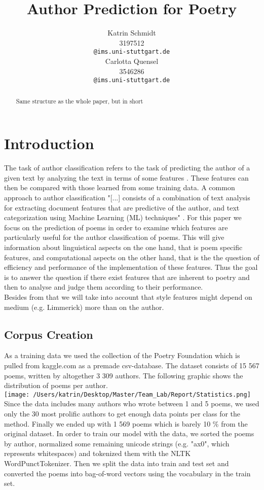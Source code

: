 \documentclass[11pt]{article}
\title{Author Prediction for Poetry}
\author{Katrin Schmidt \\
   3197512\\
  \texttt{@ims.uni-stuttgart.de} \\\And
  Carlotta Quensel \\
  3546286 \\
  \texttt{@ims.uni-stuttgart.de} \\}
\begin{document}
\maketitle
\begin{abstract}
Same structure as the whole paper, but in short
\end{abstract}

\section{Introduction}
The task of author classification refers to the task of predicting the author of a given text by analyzing the text in terms of some features \citet{Argamon:2009}. These features can then be compared with those learned from some training data. A common approach to author classification "[...] consists of a combination of text analysis for extracting document features that are predictive of the author, and text categorization using Machine Learning (ML) techniques" \citet{Luyckx:2011}. For this paper we focus on the prediction of poems in order to examine which features are particularly useful for the author classification of poems. This will give information about linguistical aspects on the one hand, that is poem specific features, and computational aspects on the other hand, that is the the question of efficiency and performance of the implementation of these features. Thus the goal is to answer the question if there exist features that are inherent to poetry and then to analyse and judge them according to their performance.\\
Besides from that we will take into account that style features might depend on medium (e.g. Limmerick) more than on the author.


\subsection{Corpus Creation}
As a training data we used the collection of the Poetry Foundation which is pulled from kaggle.com as a premade csv-database. The dataset consists of 15 567 poems, written by altogether 3 309 authors. The following graphic shows the distribution of poems per author. \\

\texttt{[image: /Users/katrin/Desktop/Master/Team\_Lab/Report/Statistics.png]}
\\

Since the data includes many authors who wrote between 1 and 5 poems, we used only the 30 most prolific authors to get enough data points per class for the method. Finally we ended up with 1 569 poems which is barely 10 \% from the original dataset.
In order to train our model with the data, we sorted the poems by author, normalized some remaining unicode strings (e.g. "ax0", which represents whitespaces) and tokenized them with the NLTK WordPunctTokenizer. Then we split the data into train and test set and converted the poems into bag-of-word vectors using the vocabulary in the train set.
\end{document}
